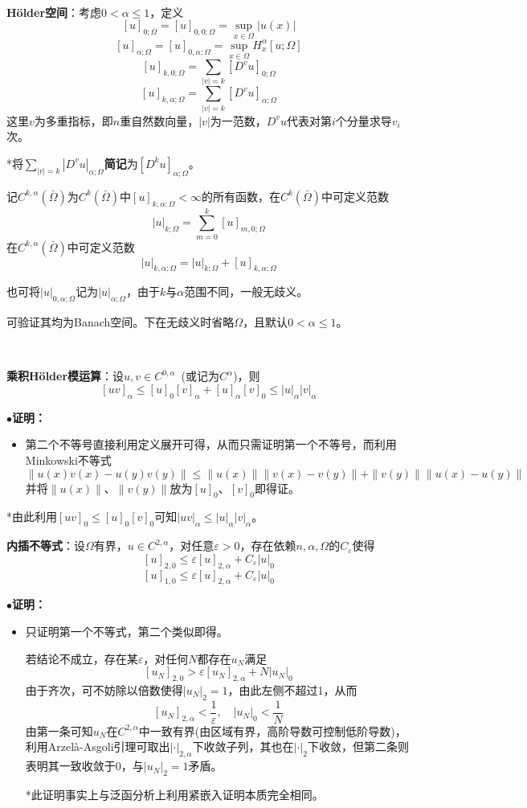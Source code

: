 \documentclass[a4paper,UTF8,fontset=windows,AutoFakeBold]{ctexart}
\newcommand{\proo}[1]{{\kaishu $\bullet$\textbf{证明：}
\begin{itemize}
    \item[] #1
\end{itemize}
}}
\begin{document}
\

\textbf{H\"older空间}：考虑$0<\alpha\le1$，定义
$$[u]_{0;\Omega}=[u]_{0,0;\Omega}=\sup_{x\in\Omega}|u(x)|$$
$$[u]_{\alpha;\Omega}=[u]_{0,\alpha;\Omega}=\sup_{x\in\Omega}H_x^\alpha[u;\Omega]$$
$$[u]_{k,0;\Omega}=\sum_{|v|=k}[D^vu]_{0;\Omega}$$
$$[u]_{k,\alpha;\Omega}=\sum_{|v|=k}[D^vu]_{\alpha;\Omega}$$
这里$v$为多重指标，即$n$重自然数向量，$|v|$为一范数，$D^vu$代表对第$i$个分量求导$v_i$次。

*将$\sum_{|v|=k}|D^vu|_{\alpha;\Omega}$\textbf{简记}为$[D^ku]_{\alpha;\Omega}$。

记$C^{k,\alpha}(\bar\Omega)$为$C^k(\bar\Omega)$中$[u]_{k,\alpha;\Omega}<\infty$的所有函数，在$C^k(\bar\Omega)$中可定义范数
$$|u|_{k;\Omega}=\sum_{m=0}^k[u]_{m,0;\Omega}$$
在$C^{k,\alpha}(\bar\Omega)$中可定义范数
$$|u|_{k,\alpha;\Omega}=|u|_{k;\Omega}+[u]_{k,\alpha;\Omega}$$

也可将$|u|_{0,\alpha;\Omega}$记为$|u|_{\alpha;\Omega}$，由于$k$与$\alpha$范围不同，一般无歧义。

可验证其均为Banach空间。下在无歧义时省略$\Omega$，且默认$0<\alpha\le1$。

\

\textbf{乘积H\"older模运算}：设$u,v\in C^{0,\alpha}$\ (或记为$C^\alpha$)，则
$$[uv]_\alpha\le[u]_0[v]_\alpha+[u]_\alpha[v]_0\le|u|_\alpha|v|_\alpha$$
\proo{
    第二个不等号直接利用定义展开可得，从而只需证明第一个不等号，而利用Minkowski不等式
    $$\|u(x)v(x)-u(y)v(y)\|\le\|u(x)\|\|v(x)-v(y)\|+\|v(y)\|\|u(x)-u(y)\|$$
    并将$\|u(x)\|$、$\|v(y)\|$放为$[u]_0$、$[v]_0$即得证。
}

*由此利用$[uv]_0\le[u]_0[v]_0$可知$|uv|_\alpha\le|u|_\alpha|v|_\alpha$。

\textbf{内插不等式}：设$\Omega$有界，$u\in C^{2,\alpha}$，对任意$\varepsilon>0$，存在依赖$n,\alpha,\Omega$的$C_\varepsilon$使得
$$[u]_{2,0}\le\varepsilon[u]_{2,\alpha}+C_\varepsilon|u|_0$$
$$[u]_{1,0}\le\varepsilon[u]_{2,\alpha}+C_\varepsilon|u|_0$$
\proo{
    只证明第一个不等式，第二个类似即得。

    若结论不成立，存在某$\varepsilon$，对任何$N$都存在$u_N$满足
    $$[u_N]_{2,0}>\varepsilon[u_N]_{2,\alpha}+N|u_N|_0$$
    由于齐次，可不妨除以倍数使得$|u_N|_2=1$，由此左侧不超过1，从而
    $$[u_N]_{2,\alpha}<\frac{1}{\varepsilon},\quad|u_N|_0<\frac{1}{N}$$
    由第一条可知$u_N$在$C^{2,\alpha}$中一致有界(由区域有界，高阶导数可控制低阶导数)，利用Arzel\`a-Asgoli引理可取出$|\cdot|_{2,\alpha}$下收敛子列，其也在$|\cdot|_2$下收敛，但第二条则表明其一致收敛于0，与$|u_N|_2=1$矛盾。

    *此证明事实上与泛函分析上利用紧嵌入证明本质完全相同。
}
\end{document}
